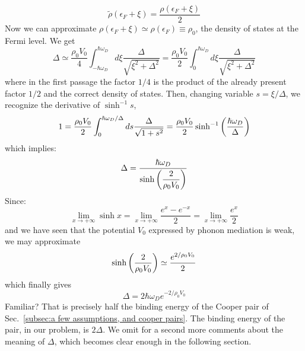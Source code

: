 \[
	\tilde{\rho}(\epsilon_F+\xi) = \frac{\rho(\epsilon_F+\xi)}{2}
\]
Now we can approximate $\rho(\epsilon_F+\xi) \simeq \rho(\epsilon_F) \equiv \rho_0$, the density of states at the Fermi level. We get
\[
	\Delta \simeq \frac{\rho_0 V_0}{4} \int_{-\hbar\omega_D}^{\hbar\omega_D} d\xi \frac{\Delta}{\sqrt{\xi^2 + \Delta^2}} = \frac{\rho_0 V_0}{2} \int_0^{\hbar\omega_D} d\xi \frac{\Delta}{\sqrt{\xi^2 + \Delta^2}}
\]
where in the first passage the factor $1/4$ is the product of the already present factor $1/2$ and the correct density of states. Then, changing variable $s=\xi/\Delta$, we recognize the derivative of $\sinh^{-1} s$,
\[
	1 = \frac{\rho_0 V_0}{2} \int_0^{\hbar\omega_D/\Delta} ds \frac{\Delta}{\sqrt{1 + s^2}} = \frac{\rho_0 V_0}{2} \sinh^{-1} \left({\frac{\hbar\omega_D}{\Delta}}\right)
\]
which implies:
\[
	\Delta = \frac{\hbar\omega_D}{\displaystyle
		\sinh\left({\frac{2}{\rho_0 V_0}}\right)
	}
\]
Since:
\[
	\lim_{x\to+\infty} \sinh x = \lim_{x\to+\infty} \frac{e^x - e^{-x}}{2} = \lim_{x\to+\infty} \frac{e^x}{2}
\]
and we have seen that the potential $V_0$ expressed by phonon mediation is weak, we may approximate
\[
	\sinh\left({\frac{2}{\rho_0 V_0}}\right) \simeq \frac{e^{2/\rho_0 V_0}}{2}
\]
which finally gives
\[
	\Delta = 2 \hbar\omega_D e^{-2/\rho_0 V_0}
\]
Familiar? That is precisely half the binding energy of the Cooper pair of Sec.~\ref{subsec:a few assumptions, and cooper pairs}. The binding energy of the pair, in our problem, is $2\Delta$. We omit for a second more comments about the meaning of $\Delta$, which becomes clear enough in the following section.

